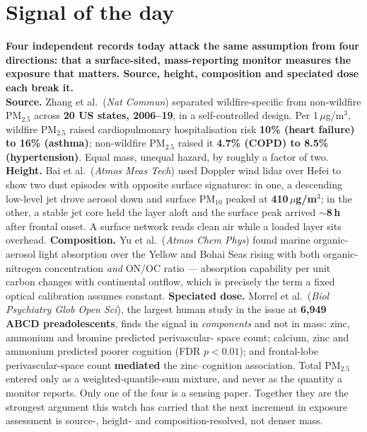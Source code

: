 \documentclass[10pt]{article}
\begin{document}
\vspace{6mm}


\section*{\sffamily\bfseries\color{Deep}Signal of the day}
\vspace{-1.5mm}{\color{Amber}\rule{\linewidth}{1.1pt}}\vspace{2.5mm}

\begin{keybox}
{\sffamily\bfseries\small\color{Deep}Four independent records today attack the same
assumption from four directions: that a surface-sited, mass-reporting monitor measures the
exposure that matters. Source, height, composition and speciated dose each break it.}\\[1.4mm]
\footnotesize
\textbf{Source.} Zhang et al.\ (\textit{Nat Commun}) separated wildfire-specific from
non-wildfire PM$_{2.5}$ across \textbf{20 US states, 2006--19}, in a self-controlled
design. Per 1\,$\mu$g/m$^3$, wildfire PM$_{2.5}$ raised cardiopulmonary hospitalisation
risk \textbf{10\% (heart failure) to 16\% (asthma)}; non-wildfire PM$_{2.5}$ raised it
\textbf{4.7\% (COPD) to 8.5\% (hypertension)}. Equal mass, unequal hazard, by roughly a
factor of two.
\textbf{Height.} Bai et al.\ (\textit{Atmos Meas Tech}) used Doppler wind lidar over
Hefei to show two dust episodes with opposite surface signatures: in one, a descending
low-level jet drove aerosol down and surface PM$_{10}$ peaked at
\textbf{410\,$\mu$g/m$^3$}; in the other, a stable jet core held the layer aloft and the
surface peak arrived \textbf{$\sim$8\,h} after frontal onset. A surface network reads
clean air while a loaded layer sits overhead.
\textbf{Composition.} Yu et al.\ (\textit{Atmos Chem Phys}) found marine organic-aerosol
light absorption over the Yellow and Bohai Seas rising with both organic-nitrogen
concentration \emph{and} ON/OC ratio --- absorption capability per unit carbon changes
with continental outflow, which is precisely the term a fixed optical calibration assumes
constant.
\textbf{Speciated dose.} Morrel et al.\ (\textit{Biol Psychiatry Glob Open Sci}), the
largest human study in the issue at \textbf{6,949 ABCD preadolescents}, finds the signal
in \emph{components} and not in mass: zinc, ammonium and bromine predicted perivascular-%
space count; calcium, zinc and ammonium predicted poorer cognition (FDR $p<0.01$); and
frontal-lobe perivascular-space count \textbf{mediated} the zinc--cognition association.
Total PM$_{2.5}$ entered only as a weighted-quantile-sum mixture, and never as the
quantity a monitor reports.
Only one of the four is a sensing paper. Together they are the strongest argument this
watch has carried that the next increment in exposure assessment is source-, height- and
composition-resolved, not denser mass.
\end{keybox}
\end{document}
